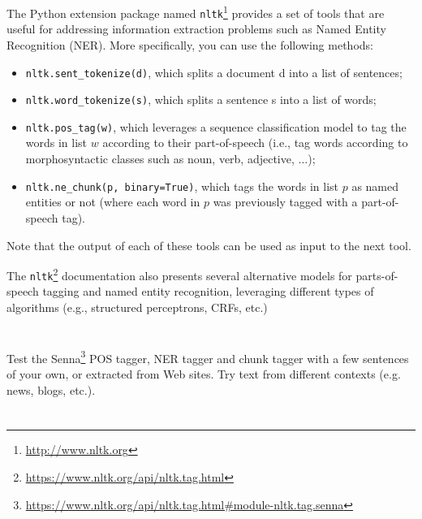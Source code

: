 \documentclass[12pt]{article}
\begin{document}

The Python extension package named \verb+nltk+\footnote{\url{http://www.nltk.org}} provides a set of tools that are useful for addressing information extraction problems such as Named Entity Recognition (NER). More specifically, you can use the following methods:

\begin{itemize}
\item \verb+nltk.sent_tokenize(d)+, which splits a document d into a list of sentences;

\item \verb+nltk.word_tokenize(s)+, which splits a sentence s into a list of words;

\item \verb+nltk.pos_tag(w)+, which leverages a sequence classification model to tag the words in list $w$ according to their part-of-speech (i.e., tag words according to morphosyntactic classes such as noun, verb, adjective, $\ldots$);

\item \verb+nltk.ne_chunk(p, binary=True)+, which tags the words in list $p$ as named entities or not (where each word in $p$ was previously tagged with a part-of-speech tag).
\end{itemize}

Note that the output of each of these tools can be used as input to the next tool.

The \verb+nltk+\footnote{\url{https://www.nltk.org/api/nltk.tag.html}} documentation also presents several alternative models for parts-of-speech tagging and named entity recognition, leveraging different types of algorithms (e.g., structured perceptrons, CRFs, etc.)

\section{}

Test the Senna\footnote{\url{https://www.nltk.org/api/nltk.tag.html\#module-nltk.tag.senna}} POS tagger, NER tagger and chunk tagger with a few sentences of your own, or extracted from Web sites. Try text from different contexts (e.g. news, blogs, etc.).

\section{}
\end{document}
